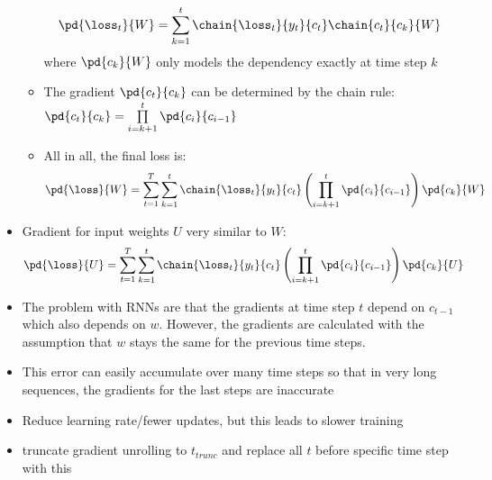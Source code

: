 \begin{itemize}
\begin{itemize}
		$$\pd{\loss_t}{W} = \sum\limits_{k=1}^{t} \chain{\loss_t}{y_t}{c_t}\chain{c_t}{c_k}{W}$$
		where $\pd{c_k}{W}$ only models the dependency exactly at time step $k$
		\item The gradient $\pd{c_t}{c_k}$ can be determined by the chain rule: $\pd{c_t}{c_k} = \prod\limits_{i=k+1}^{t} \pd{c_i}{c_{i-1}}$
		\item All in all, the final loss is:
		\begin{equation*}
			\begin{split}
				\pd{\loss}{W} & = \sum\limits_{t=1}^{T}\sum\limits_{k=1}^{t} \chain{\loss_t}{y_t}{c_t}\left(\prod\limits_{i=k+1}^{t} \pd{c_i}{c_{i-1}}\right)\pd{c_k}{W}
			\end{split}
		\end{equation*}
	\end{itemize}
	\item Gradient for input weights $U$ very similar to $W$: 
	\begin{equation*}
		\begin{split}
			\pd{\loss}{U} & = \sum\limits_{t=1}^{T}\sum\limits_{k=1}^{t} \chain{\loss_t}{y_t}{c_t}\left(\prod\limits_{i=k+1}^{t} \pd{c_i}{c_{i-1}}\right)\pd{c_k}{U}
		\end{split}
	\end{equation*}
	\item The problem with RNNs are that the gradients at time step $t$ depend on $c_{t-1}$ which also depends on $w$. However, the gradients are calculated with the assumption that $w$ stays the same for the previous time steps.
	\item This error can easily accumulate over many time steps so that in very long sequences, the gradients for the last steps are inaccurate
	\item Reduce learning rate/fewer updates, but this leads to slower training
	\item truncate gradient unrolling to $t_{trunc}$ and replace all $t$ before specific time step with this
\end{itemize}
